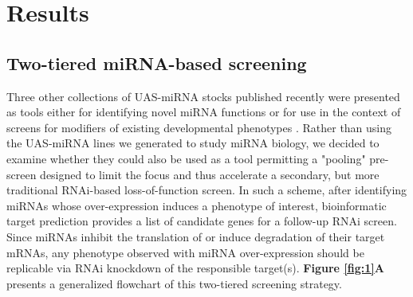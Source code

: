 \section*{Results}

\subsection*{Two-tiered miRNA-based screening}

Three other collections of UAS-miRNA stocks published recently were presented as tools either for identifying novel miRNA functions \cite{aleigh_Kim_Ni_Duan_et_al__2012,shauser_Forstemann_Basler_2012} or for use in the context of screens for modifiers of existing developmental phenotypes \cite{gler_Lim_Verma_Chen_Cohen_2012}.
Rather than using the UAS-miRNA lines we generated \cite{suh:2015aa} to study miRNA biology, we decided to examine whether they could also be used as a tool permitting a "pooling" pre-screen designed to limit the focus and thus accelerate a secondary, but more traditional RNAi-based loss-of-function screen.
In such a scheme, after identifying miRNAs whose over-expression induces a phenotype of interest, bioinformatic target prediction provides a list of candidate genes for a follow-up RNAi screen.
Since miRNAs inhibit the translation of or induce degradation of their target mRNAs, any phenotype observed with miRNA over-expression should be replicable via RNAi knockdown of the responsible target(s).
\textbf{Figure \ref{fig:1}A} presents a generalized flowchart of this two-tiered screening strategy.